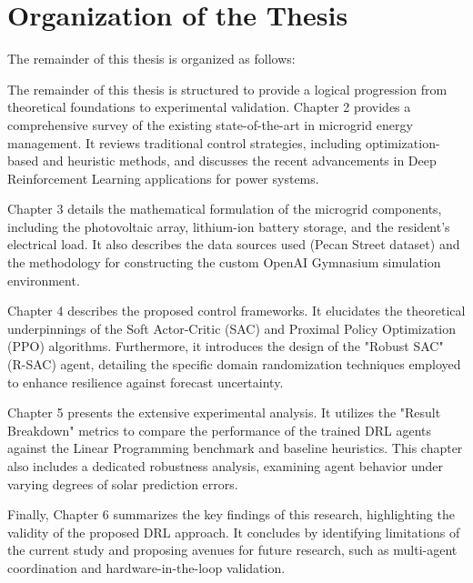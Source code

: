 
\section{Organization of the Thesis}

The remainder of this thesis is organized as follows:

The remainder of this thesis is structured to provide a logical progression from theoretical foundations to experimental validation. Chapter 2 provides a comprehensive survey of the existing state-of-the-art in microgrid energy management. It reviews traditional control strategies, including optimization-based and heuristic methods, and discusses the recent advancements in Deep Reinforcement Learning applications for power systems.

Chapter 3 details the mathematical formulation of the microgrid components, including the photovoltaic array, lithium-ion battery storage, and the resident's electrical load. It also describes the data sources used (Pecan Street dataset) and the methodology for constructing the custom OpenAI Gymnasium simulation environment.

Chapter 4 describes the proposed control frameworks. It elucidates the theoretical underpinnings of the Soft Actor-Critic (SAC) and Proximal Policy Optimization (PPO) algorithms. Furthermore, it introduces the design of the "Robust SAC" (R-SAC) agent, detailing the specific domain randomization techniques employed to enhance resilience against forecast uncertainty.

Chapter 5 presents the extensive experimental analysis. It utilizes the "Result Breakdown" metrics to compare the performance of the trained DRL agents against the Linear Programming benchmark and baseline heuristics. This chapter also includes a dedicated robustness analysis, examining agent behavior under varying degrees of solar prediction errors.

Finally, Chapter 6 summarizes the key findings of this research, highlighting the validity of the proposed DRL approach. It concludes by identifying limitations of the current study and proposing avenues for future research, such as multi-agent coordination and hardware-in-the-loop validation.
